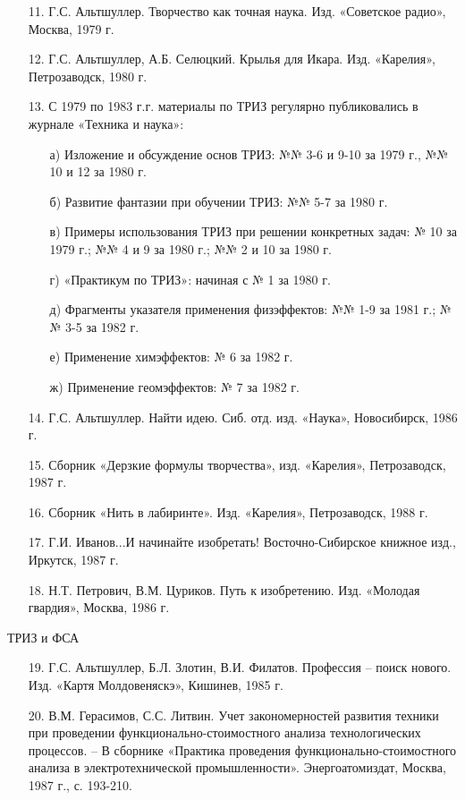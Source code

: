 \documentclass[11pt,a4paper]{article}
\begin{document}
\begin{itemize}
\item[11.] Г.С. Альтшуллер. Творчество как точная наука. Изд. «Советское
  радио», Москва, 1979 г.
\item[12.] Г.С. Альтшуллер, А.Б. Селюцкий. Крылья для Икара. Изд. «Карелия»,
  Петрозаводск, 1980 г.
\item[13.] С 1979 по 1983 г.г. материалы по ТРИЗ регулярно публиковались в
  журнале «Техника и наука»:
  \begin{itemize}[noitemsep]
  \item[а)] Изложение и обсуждение основ ТРИЗ: №№ 3-6 и 9-10 за 1979 г., №№ 10
    и 12 за 1980 г.
  \item[б)] Развитие фантазии при обучении ТРИЗ: №№ 5-7 за 1980 г.
  \item[в)] Примеры использования ТРИЗ при решении конкретных задач: № 10 за
    1979 г.; №№ 4 и 9 за 1980 г.; №№ 2 и 10 за 1980 г.
  \item[г)] «Практикум по ТРИЗ»: начиная с № 1 за 1980 г.
  \item[д)] Фрагменты указателя применения физэффектов: №№ 1-9 за 1981 г.; №№
    3-5 за 1982 г.
  \item[е)] Применение химэффектов: № 6 за 1982 г.
  \item[ж)] Применение геомэффектов: № 7 за 1982 г.
  \end{itemize}
\item[14.] Г.С. Альтшуллер. Найти идею. Сиб. отд. изд. «Наука», Новосибирск,
  1986 г.
\item[15.] Сборник «Дерзкие формулы творчества», изд. «Карелия», Петрозаводск,
  1987 г.
\item[16.] Сборник «Нить в лабиринте». Изд. «Карелия», Петрозаводск, 1988 г.
\item[17.] Г.И. Иванов...И начинайте изобретать! Восточно-Сибирское книжное
  изд., Иркутск, 1987 г.
\item[18.] Н.Т. Петрович, В.М. Цуриков. Путь к изобретению. Изд. «Молодая
  гвардия», Москва, 1986 г.
\end{itemize}
ТРИЗ и ФСА
\begin{itemize}
\item[19.] Г.С. Альтшуллер, Б.Л. Злотин, В.И. Филатов. Профессия -- поиск
  нового.  Изд. «Картя Молдовеняскэ», Кишинев, 1985 г.
\item[20.] В.М. Герасимов, С.С. Литвин. Учет закономерностей развития техники
  при проведении функционально-стоимостного анализа технологических процессов.
  -- В сборнике «Практика проведения функционально-стоимостного анализа в
  электротехнической промышленности». Энергоатомиздат, Москва, 1987 г.,
  с. 193-210.
\end{itemize}
\end{document}
